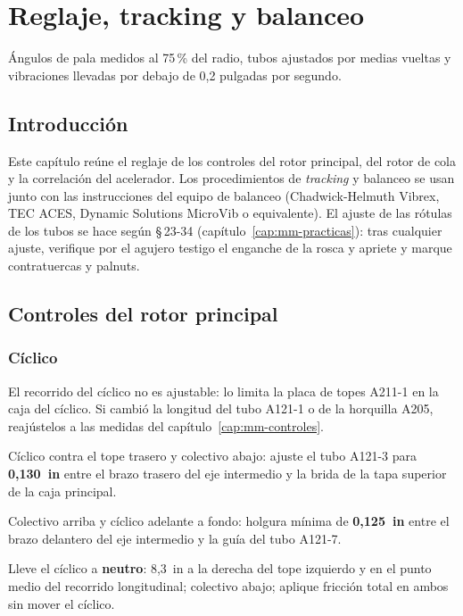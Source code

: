 \chapter{Reglaje, tracking y balanceo}
\label{cap:mm-reglaje}

\opening{Ángulos de pala medidos al 75\,\% del radio, tubos ajustados por medias vueltas y vibraciones llevadas por debajo de 0,2 pulgadas por segundo.}

\section{Introducción}

Este capítulo reúne el reglaje de los controles del rotor principal, del rotor de cola y la correlación del acelerador. Los procedimientos de \emph{tracking} y balanceo se usan junto con las instrucciones del equipo de balanceo (Chadwick-Helmuth Vibrex, TEC ACES, Dynamic Solutions MicroVib o equivalente). El ajuste de las rótulas de los tubos se hace según \S\,23-34 (capítulo~\ref{cap:mm-practicas}): tras cualquier ajuste, verifique por el agujero testigo el enganche de la rosca y apriete y marque contratuercas y palnuts.

\section{Controles del rotor principal}

\subsection{Cíclico}

El recorrido del cíclico no es ajustable: lo limita la placa de topes A211-1 en la caja del cíclico. Si cambió la longitud del tubo A121-1 o de la horquilla A205, reajústelos a las medidas del capítulo~\ref{cap:mm-controles}.

\begin{pasos}
\item Cíclico contra el tope trasero y colectivo abajo: ajuste el tubo A121-3 para \textbf{0,130~in} entre el brazo trasero del eje intermedio y la brida de la tapa superior de la caja principal.
\item Colectivo arriba y cíclico adelante a fondo: holgura mínima de \textbf{0,125~in} entre el brazo delantero del eje intermedio y la guía del tubo A121-7.
\item Lleve el cíclico a \textbf{neutro}: 8,3~in a la derecha del tope izquierdo y en el punto medio del recorrido longitudinal; colectivo abajo; aplique fricción total en ambos sin mover el cíclico.
\end{pasos}

